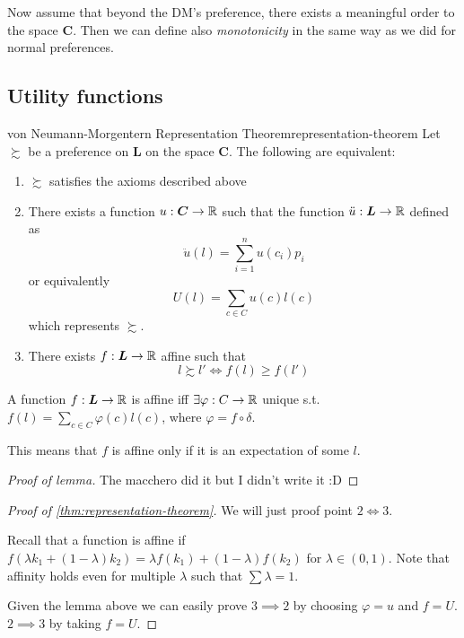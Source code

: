 \documentclass[12pt]{extarticle}
\begin{document}
Now assume that beyond the DM's preference, there exists a meaningful order to the space $\bm C$.
Then we can define also \emph{monotonicity} in the same way as we did for normal preferences.

\subsection{Utility functions}

\begin{theorem}{von Neumann-Morgentern Representation Theorem}{representation-theorem}
    Let $\succsim$ be a preference on $\bm L$ on the space $\bm C$.
    The following are equivalent:
    \begin{enumerate}
        \item $\succsim$ satisfies the axioms described above
        \item There exists a function $u:\bm C \to \mathbb{R}$ such that the function $\ddot u : \bm L \to \mathbb{R}$ defined as
              \begin{equation}
                  \ddot u(l) = \sum^n_{i = 1} u(c_i) p_i
              \end{equation}
              or equivalently
              \begin{equation}
                  U(l) = \sum_{c \in C} u(c) l(c)
              \end{equation}
              which represents $\succsim$.
        \item There exists $f:\bm L \to \mathbb{R}$ affine such that
              \begin{equation}
                  l \succsim l' \iff f(l) \geq f(l')
              \end{equation}
    \end{enumerate}
\end{theorem}

\begin{lemma}{}{}
    A function $f:\bm L \to \mathbb{R}$ is affine iff $\exists \varphi : C \to \mathbb{R}$ unique s.t. $f(l) = \sum_{c \in C} \varphi(c) l(c)$, where $\varphi = f \circ \delta$.

    This means that $f$ is affine only if it is an expectation of some $l$.
\end{lemma}
\begin{proof}[Proof of lemma]
    The macchero did it but I didn't write it :D
\end{proof}

\begin{proof}[Proof of \cref{thm:representation-theorem}]
    We will just proof point $2 \iff 3$.

    Recall that a function is affine if $f(\lambda k_1 + (1- \lambda) k_2) = \lambda f (k_1) + (1 - \lambda ) f(k_2)$ for $\lambda \in (0, 1)$.
    Note that affinity holds even for multiple $\lambda$ such that $\sum \lambda = 1$.

    Given the lemma above we can easily prove $3 \implies 2$ by choosing $\varphi = u$ and $f = U$.
    $2 \implies 3$  by taking $f = U$.
\end{proof}
\end{document}
